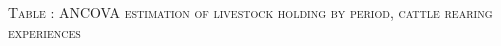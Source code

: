 \vspace{-1cm}\hspace{-1cm}\begin{minipage}[t]{14cm}
\hfil\textsc{\normalsize Table \thetable: ANCOVA estimation of livestock holding by period, cattle rearing experiences\label{tab ANCOVA livestock holding Experience timevarying}}\\
\setlength{\tabcolsep}{1pt}
\setlength{\baselineskip}{8pt}
\renewcommand{\arraystretch}{.52}
\hfil{}
\end{minipage}

